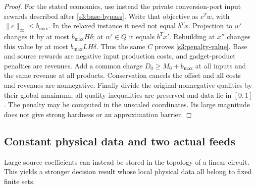 \begin{proof}
For the stated economics, use instead the private conversion-port input
rewards described after \cref{s3:base-bypass}. Write that objective as
$c^Tw$, with $\|c\|_\infty\le b_{\max}$. In the relaxed instance it
need not equal $b^Tx$. Projection to $w'$ changes it by at most
$b_{\max}H\delta$; at $w'\in Q$ it equals $b^Tx'$. Rebuilding at
$x''$ changes this value by at most $b_{\max}LH\delta$. Thus the
same $C$ proves \eqref{s3:penalty-value}. Base and source rewards are
negative input production costs, and gadget-product penalties are
revenues. Add a common charge $D_0\ge M_0+b_{\max}$ at all inputs
and the same revenue at all products. Conservation cancels the offset
and all costs and revenues are nonnegative. Finally divide the original
nonnegative qualities by their global maximum; all quality inequalities
are preserved and data lie in $[0,1]$. The penalty may be computed in
the unscaled coordinates. Its large magnitude does not give strong
hardness or an approximation barrier.
\end{proof}

\subsection{Constant physical data and two actual feeds}\label{s3:constant-data}

Large source coefficients can instead be stored in the topology of a
linear circuit. This yields a stronger decision result whose local
physical data all belong to fixed finite sets.

